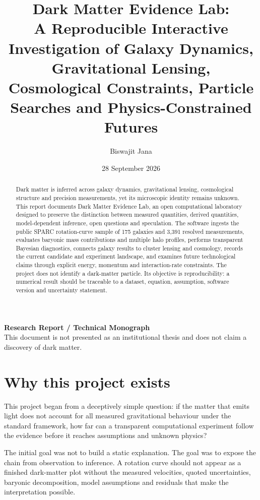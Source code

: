 \documentclass[11pt,a4paper]{article}
\title{Dark Matter Evidence Lab:\\A Reproducible Interactive Investigation of Galaxy Dynamics, Gravitational Lensing, Cosmological Constraints, Particle Searches and Physics-Constrained Futures}
\author{Biswajit Jana}
\date{28 September 2026}
\begin{document}
\maketitle
\begin{center}
\textbf{Research Report / Technical Monograph}\\[0.5em]
This document is not presented as an institutional thesis and does not claim a discovery of dark matter.
\end{center}

\begin{abstract}
Dark matter is inferred across galaxy dynamics, gravitational lensing, cosmological structure and precision measurements, yet its microscopic identity remains unknown. This report documents Dark Matter Evidence Lab, an open computational laboratory designed to preserve the distinction between measured quantities, derived quantities, model-dependent inference, open questions and speculation. The software ingests the public SPARC rotation-curve sample of 175 galaxies and 3,391 resolved measurements, evaluates baryonic mass contributions and multiple halo profiles, performs transparent Bayesian diagnostics, connects galaxy results to cluster lensing and cosmology, records the current candidate and experiment landscape, and examines future technological claims through explicit energy, momentum and interaction-rate constraints. The project does not identify a dark-matter particle. Its objective is reproducibility: a numerical result should be traceable to a dataset, equation, assumption, software version and uncertainty statement.
\end{abstract}

\tableofcontents
\newpage

\section{Why this project exists}
This project began from a deceptively simple question: if the matter that emits light does not account for all measured gravitational behaviour under the standard framework, how far can a transparent computational experiment follow the evidence before it reaches assumptions and unknown physics?

The initial goal was not to build a static explanation. The goal was to expose the chain from observation to inference. A rotation curve should not appear as a finished dark-matter plot without the measured velocities, quoted uncertainties, baryonic decomposition, model assumptions and residuals that make the interpretation possible.
\end{document}
